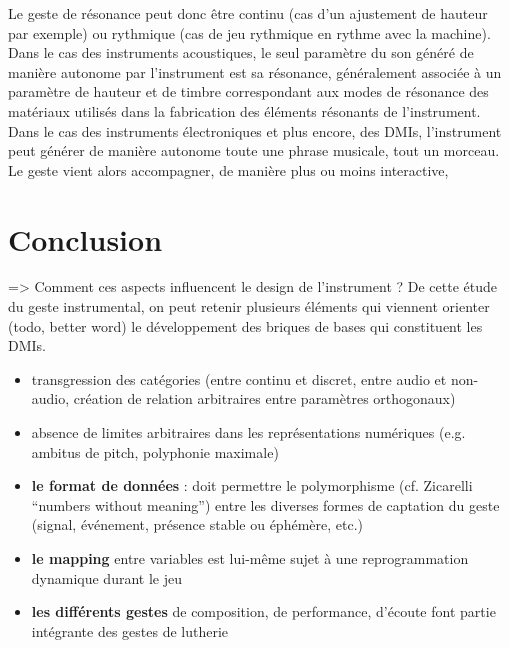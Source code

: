 Le geste de résonance peut donc être continu (cas d'un ajustement de hauteur par exemple) ou rythmique (cas de jeu rythmique en rythme avec la machine).
Dans le cas des instruments acoustiques, le seul paramètre du son généré de manière autonome par l'instrument est sa résonance, généralement associée à un paramètre de hauteur et de timbre correspondant aux modes de résonance des matériaux utilisés dans la fabrication des éléments résonants de l'instrument. Dans le cas des instruments électroniques et plus encore, des \glspl{DMI}, l'instrument peut générer de manière autonome toute une phrase musicale, tout un morceau. Le geste vient alors accompagner, de manière plus ou moins interactive, 




 
\section{Conclusion}
\label{sec:gesture:conclusion}
=> Comment ces aspects influencent le design de l’instrument ?
De cette étude du geste instrumental, on peut retenir plusieurs éléments qui viennent orienter (todo, better word) le développement des briques de bases qui constituent les DMIs.

\vspace{-1em}
\begin{itemize}[noitemsep]
\item transgression des catégories (entre continu et discret, entre audio et non-audio, création de relation arbitraires entre paramètres orthogonaux)
\item absence de limites arbitraires dans les représentations numériques (e.g. ambitus de pitch, polyphonie maximale)
\end{itemize}

\vspace{-1em}
\begin{itemize}[noitemsep]
\item \textbf{le format de données} : doit permettre le polymorphisme (cf. Zicarelli ``numbers without meaning'') entre les diverses formes de captation du geste (signal, événement, présence stable ou éphémère, etc.)
\item \textbf{le mapping} entre variables est lui-même sujet à une reprogrammation dynamique durant le jeu
\item \textbf{les différents gestes} de composition, de performance, d'écoute font partie intégrante des gestes de lutherie
\end{itemize}


